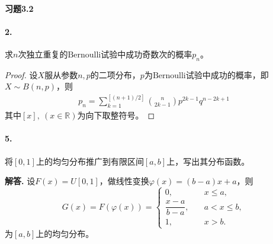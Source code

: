 \documentclass[12pt, a4paper, oneside]{ctexart}
\newenvironment{solution}{\par\noindent\textbf{解答. }}{\bigskip\par}
\begin{document}
\paragraph{习题3.2}
\paragraph{2.}求$n$次独立重复的$\text{Bernoulli}$试验中成功奇数次的概率$p_n$。
\begin{proof}
    设$X$服从参数$n, p$的二项分布，$p$为$\text{Bernoulli}$试验中成功的概率，即$X\sim B(n, p)$，则
    \begin{equation*}
        \begin{aligned}
            p_n = \sum_{k=1}^{[(n+1)/2]}\binom{n}{2k-1}p^{2k-1}q^{n-2k+1}
        \end{aligned}
    \end{equation*}
    其中$[x],\ (x\in\mathbb{R})$为向下取整符号。
\end{proof}
\paragraph{5.}将$[0,1]$上的均匀分布推广到有限区间$[a,b]$上，写出其分布函数。
\begin{solution}
    设$F(x) = U[0,1]$，做线性变换$\varphi(x) = (b-a)x+a$，则
    \begin{equation*}
        G(x) = F(\varphi(x)) = 
        \begin{cases}
            0, &\quad x\leqslant a,\\
            \dfrac{x-a}{b-a},&\quad a<x\leqslant b,\\
            1,&\quad x > b.
        \end{cases}
    \end{equation*}
    为$[a,b]$上的均匀分布。
\end{solution}
\end{document}
